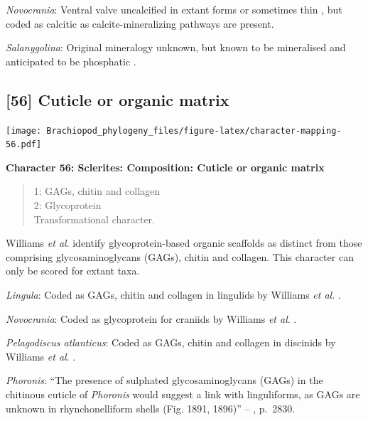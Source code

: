 \documentclass[openany]{book}
\theoremstyle{definition}
\theoremstyle{definition}
\theoremstyle{definition}
\theoremstyle{remark}
\begin{document}
\hypertarget{Novocrania-coding-55}{}
\emph{Novocrania}: Ventral valve uncalcified in extant forms or
sometimes thin \citep{Williams2000LinguliformeaCraniiformea}, but coded
as calcitic as calcite-mineralizing pathways are present.

\hypertarget{Salanygolina-coding-55}{}
\emph{Salanygolina}: Original mineralogy unknown, but known to be
mineralised and anticipated to be phosphatic
\citep{Holmer2009Theenigmatic}.

\subsection*{{[}56{]} Cuticle or organic
matrix}\label{cuticle-or-organic-matrix}

\texttt{[image: Brachiopod\_phylogeny\_files/figure-latex/character-mapping-56.pdf]}

\textbf{Character 56: Sclerites: Composition: Cuticle or organic matrix}

\begin{quote}
1: GAGs, chitin and collagen\\
2: Glycoprotein\\
Transformational character.
\end{quote}

Williams \emph{et al}. \citeyearpar{Williams1996Asupra} identify
glycoprotein-based organic scaffolds as distinct from those comprising
glycosaminoglycans (GAGs), chitin and collagen. This character can only
be scored for extant taxa.

\hypertarget{Lingula-coding-56}{}
\emph{Lingula}: Coded as GAGs, chitin and collagen in lingulids by
Williams \emph{et al}. \citeyearpar{Williams1996Asupra}.

\hypertarget{Novocrania-coding-56}{}
\emph{Novocrania}: Coded as glycoprotein for craniids by Williams
\emph{et al}. \citeyearpar{Williams1996Asupra}.

\hypertarget{Pelagodiscus_atlanticus-coding-56}{}
\emph{Pelagodiscus atlanticus}: Coded as GAGs, chitin and collagen in
discinids by Williams \emph{et al}. \citeyearpar{Williams1996Asupra}.

\hypertarget{Phoronis-coding-56}{}
\emph{Phoronis}: ``The presence of sulphated glycosaminoglycans (GAGs)
in the chitinous cuticle of \emph{Phoronis}
\citep[p.~215]{Herrmann1997Phoronida} would suggest a link with
linguliforms, as GAGs are unknown in rhynchonelliform shells (Fig. 1891,
1896)'' -- \citet{Williams2007Supplement}, p.~2830.
\end{document}
